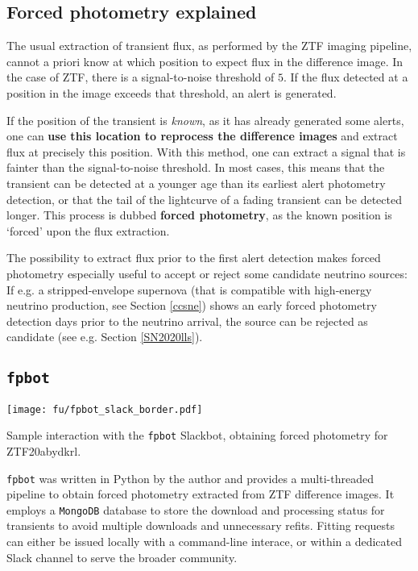 \subsection{Forced photometry explained}
The usual extraction of transient flux, as performed by the ZTF imaging pipeline, cannot a priori know at which position to expect flux in the difference image. In the case of ZTF, there is a signal-to-noise threshold of $5$. If the flux detected at a position in the image exceeds that threshold, an alert is generated.

If the position of the transient is \textit{known}, as it has already generated some alerts, one can \textbf{use this location to reprocess the difference images} and extract flux at precisely this position. With this method, one can extract a signal that is fainter than the signal-to-noise threshold. In most cases, this means that the transient can be detected at a younger age than its earliest alert photometry detection, or that the tail of the lightcurve of a fading transient can be detected longer. This process is dubbed \textbf{forced photometry}, as the known position is `forced' upon the flux extraction.

The possibility to extract flux prior to the first alert detection makes forced photometry especially useful to accept or reject some candidate neutrino sources: If e.g. a stripped-envelope supernova (that is compatible with high-energy neutrino production, see Section \ref{ccsne}) shows an early forced photometry detection days prior to the neutrino arrival, the source can be rejected as candidate (see e.g. Section \ref{SN2020lls}).

\subsection{\texttt{fpbot}}
\begin{marginfigure}
    \texttt{[image: fu/fpbot\_slack\_border.pdf]}
    \caption[\texttt{fpbot} Slackbot interaction]{Sample interaction with the \texttt{fpbot} Slackbot, obtaining forced photometry for ZTF20abydkrl.}
\end{marginfigure} 
\texttt{fpbot} was written in Python by the author and provides a multi-threaded pipeline to obtain forced photometry extracted from ZTF difference images. It employs a \texttt{MongoDB} database to store the download and processing status for transients to avoid multiple downloads and unnecessary refits. Fitting requests can either be issued locally with a command-line interace, or within a dedicated Slack channel to serve the broader community.

